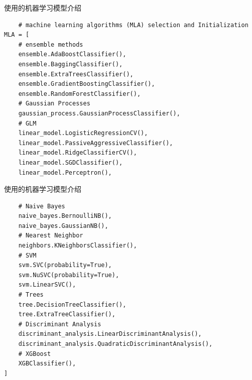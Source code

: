 \documentclass{beamer}
\begin{document}
\begin{frame}[fragile]{使用的机器学习模型介绍}
	\begin{verbatim}
	# machine learning algorithms (MLA) selection and Initialization
MLA = [
    # ensemble methods
    ensemble.AdaBoostClassifier(),
    ensemble.BaggingClassifier(),
    ensemble.ExtraTreesClassifier(),
    ensemble.GradientBoostingClassifier(),
    ensemble.RandomForestClassifier(),
    # Gaussian Processes
    gaussian_process.GaussianProcessClassifier(),
    # GLM
    linear_model.LogisticRegressionCV(),
    linear_model.PassiveAggressiveClassifier(),
    linear_model.RidgeClassifierCV(),
    linear_model.SGDClassifier(),
    linear_model.Perceptron(),
	\end{verbatim}
\end{frame}

\begin{frame}[fragile]{使用的机器学习模型介绍}
	\begin{verbatim}
    # Naive Bayes
    naive_bayes.BernoulliNB(),
    naive_bayes.GaussianNB(),
    # Nearest Neighbor
    neighbors.KNeighborsClassifier(),
    # SVM
    svm.SVC(probability=True),
    svm.NuSVC(probability=True),
    svm.LinearSVC(),
    # Trees
    tree.DecisionTreeClassifier(),
    tree.ExtraTreeClassifier(),
    # Discriminant Analysis
    discriminant_analysis.LinearDiscriminantAnalysis(),
    discriminant_analysis.QuadraticDiscriminantAnalysis(),
    # XGBoost
    XGBClassifier(),
]
	\end{verbatim}
\end{frame}
\end{document}
